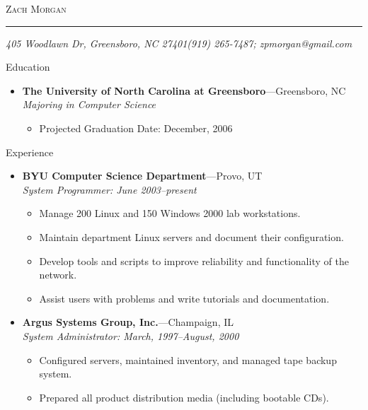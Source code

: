 \documentclass[11pt,oneside]{article}
\makeatletter
\newcommand{\name}{Zach Morgan}
\newcommand{\addr}{405 Woodlawn Dr, Greensboro, NC 27401}
\newcommand{\phone}{(919) 265-7487}
\newcommand{\email}{zpmorgan@gmail.com}
\newcommand{\bigname}[1]{
	\begin{center}\fontfamily{phv}\selectfont\Huge\scshape#1\end{center}
}
\newenvironment{ressection}[1]{
	\vspace{4pt}
	{\fontfamily{phv}\selectfont\Large#1}
	\begin{itemize}
	\vspace{3pt}
}{
	\end{itemize}
}
\newcommand{\ressubitem}[1]{
	\vspace{-1pt}
	\item \begin{flushleft} #1 \end{flushleft}
}
\newcommand{\resbigitem}[3]{
	\vspace{-5pt}
	\item
	\textbf{#1}---#2 \\
	\textit{#3}
}
\newenvironment{ressubsec}[3]{
	\resbigitem{#1}{#2}{#3}
	\vspace{-2pt}
	\begin{itemize}
}{
	\end{itemize}
}
\makeatother
\begin{document}
 \selectfont

\bigname{\name}

\vspace{-8pt} \rule{\textwidth}{1pt}

\vspace{-1pt} {\small\itshape \addr \hfill \phone; \email}

\vspace{8 pt}




\begin{ressection}{Education}

	\begin{ressubsec}{The University of North Carolina at Greensboro}{Greensboro, NC}{Majoring in Computer Science}
		\ressubitem{Projected Graduation Date: December, 2006}
	\end{ressubsec}

\end{ressection}


\begin{ressection}{Experience}

	\begin{ressubsec}{BYU Computer Science Department}{Provo, UT}{System Programmer: June 2003--present}
		\ressubitem{Manage 200 Linux and 150 Windows 2000 lab workstations.}
		\ressubitem{Maintain department Linux servers and document their configuration.}
		\ressubitem{Develop tools and scripts to improve reliability and functionality of the network.}
		\ressubitem{Assist users with problems and write tutorials and documentation.}
	\end{ressubsec}

	\begin{ressubsec}{Argus Systems Group, Inc.}{Champaign, IL}{System Administrator: March, 1997--August, 2000}
		\ressubitem{Configured servers, maintained inventory, and managed tape backup system.}
		\ressubitem{Prepared all product distribution media (including bootable CDs).}
	\end{ressubsec}

\end{ressection}
\end{document}
